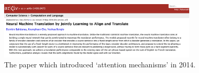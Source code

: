 \documentclass[11pt]{article}
\begin{document}
\begin{figure}
\centering 
\includegraphics[width=0.85\textwidth]{paper1.png}
\caption{\label{fig:PAPER1}The paper which introduced `attention mechanisms' in 2014.}
\end{figure}






	
	\newpage
	
	
\end{document}
